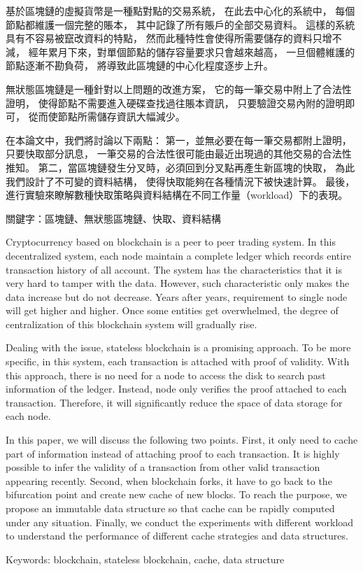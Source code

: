 \begin{abstractzh}
基於區塊鏈的虛擬貨幣是一種點對點的交易系統，
在此去中心化的系統中，
每個節點都維護一個完整的賬本，
其中記錄了所有賬戶的全部交易資料。
這樣的系統具有不容易被竄改資料的特點，
然而此種特性會使得所需要儲存的資料只增不減，
經年累月下來，對單個節點的儲存容量要求只會越來越高，
一旦個體維護的節點逐漸不勘負荷，
將導致此區塊鏈的中心化程度逐步上升。

無狀態區塊鏈是一種針對以上問題的改進方案，
它的每一筆交易中附上了合法性證明，
使得節點不需要進入硬碟查找過往賬本資訊，
只要驗證交易內附的證明即可，
從而使節點所需儲存資訊大幅減少。

在本論文中，我們將討論以下兩點：
第一，並無必要在每一筆交易都附上證明，
只要快取部分訊息，
一筆交易的合法性很可能由最近出現過的其他交易的合法性推知。
第二，當區塊鏈發生分叉時，必須回到分叉點再產生新區塊的快取，
為此我們設計了不可變的資料結構，
使得快取能夠在各種情況下被快速計算。
最後，進行實驗來瞭解數種快取策略與資料結構在不同工作量（workload）下的表現。


\bigbreak
\noindent
關鍵字：區塊鏈、無狀態區塊鏈、快取、資料結構
\end{abstractzh}

\begin{abstracten}

Cryptocurrency based on blockchain is a peer to peer trading system. In this decentralized system, each node maintain a complete ledger which records entire transaction history of all account. The system has the characteristics that it is very hard to tamper with the data. However, such characteristic only makes the data increase but do not decrease. Years after years, requirement to single node will get higher and higher. Once some entities get overwhelmed, the degree of centralization of this blockchain system will gradually rise.

Dealing with the issue, stateless blockchain is a promising approach. To be more specific, in this system, each transaction is attached with proof of validity. With this approach, there is no need for a node to access the disk to search past information of the ledger. Instead, node only verifies the proof attached to each transaction. Therefore, it will significantly reduce the space of data storage for each node.

In this paper, we will discuss the following two points.
First, it only need to cache part of information instead of attaching proof to each transaction. It is highly possible to infer the validity of a transaction from other valid transaction appearing recently. Second, when blockchain forks, it have to go back to the bifurcation point and create new cache of new blocks. To reach the purpose, we propose an immutable data structure so that cache can be rapidly computed under any situation. Finally, we conduct the experiments with different workload to understand the performance of different cache strategies and data structures.

\bigbreak
\noindent
Keywords: blockchain, stateless blockchain, cache, data structure
\end{abstracten}

